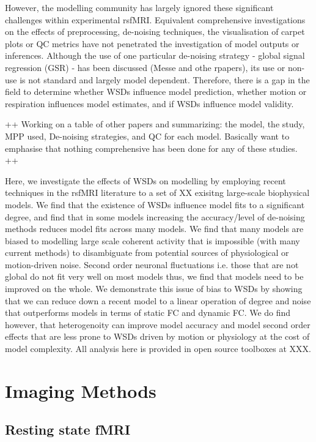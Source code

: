 \documentclass[oneside]{zHenriquesLab-StyleBioRxiv}
\begin{document}
However, the modelling community has largely ignored these significant challenges within experimental rsfMRI. Equivalent comprehensive investigations on the effects of preprocessing, de-noising techniques, the visualisation of carpet plots or QC metrics have not penetrated the investigation of model outputs or inferences. Although the use of one particular de-noising strategy - global signal regression (GSR) - has been discussed (Messe and othe rpapers), its use or non-use is not standard and largely model dependent. Therefore, there is a gap in the field to determine whether WSDs influence model prediction, whether motion or respiration influences model estimates, and if WSDs influence model validity. 


++ Working on a table of other papers and summarizing: the model, the study, MPP used, De-noising strategies, and QC for each model. Basically want to emphasise that nothing comprehensive has been done for any of these studies. ++


Here, we investigate the effects of WSDs on modelling by employing recent techniques in the rsfMRI literature to a set of XX exisitng large-scale biophysical models. We find that the existence of WSDs influence model fits to a significant degree, and find that in some models increasing the accuracy/level of de-noising methods reduces model fits across many models. We find that many models are biased to modelling large scale coherent activity that is impossible (with many current methods) to disambiguate from potential sources of physiological or motion-driven noise. Second order neuronal fluctuations i.e. those that are not global do not fit very well on most models thus, we find that models need to be improved on the whole. We demonstrate this issue of bias to WSDs by showing that we can reduce down a recent model to a linear operation of degree and noise that outperforms models in terms of static FC and dynamic FC. We do find however, that heterogenoity can improve model accuracy and model second order effects that are less prone to WSDs driven by motion or physiology at the cost of model complexity. All analysis here is provided in open source toolboxes at XXX.


\section*{Imaging Methods}

\subsection*{Resting state fMRI}
\end{document}
